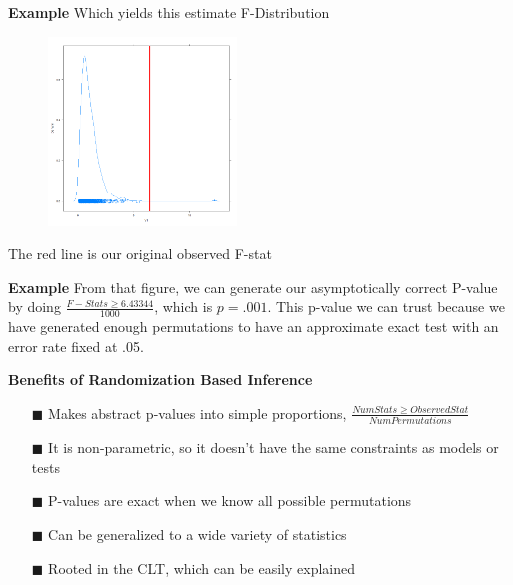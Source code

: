\documentclass{beamer}
\begin{document}
\begin{frame}{\textbf{Example}}
Which yields this estimate F-Distribution
     \begin{figure}
        \centering
        \includegraphics[width = 5cm]{DensityPlot.png}
    \end{figure}
The red line is our original observed F-stat
\end{frame}
\begin{frame}{\textbf{Example}}
    From that figure, we can generate our asymptotically correct P-value by doing $\frac{F-Stats \geq{6.43344}}{1000}$, which is $p = .001$. 
    This p-value we can trust because we have generated enough permutations to have an approximate exact test with an error rate fixed at .05. 
\end{frame}
\begin{frame}{\textbf{Benefits of Randomization Based Inference}}
    \begin{itemize}
    
        \item[$\blacksquare$] Makes abstract p-values into simple proportions, $\frac{Num Stats \geq{Observed Stat}}{NumPermutations}$ 
        
        \item[$\blacksquare$] It is non-parametric, so it doesn't have the same constraints as models or tests
        
        \item[$\blacksquare$] P-values are exact when we know all possible permutations
        
        \item[$\blacksquare$] Can be generalized to a wide variety of statistics
        
        \item[$\blacksquare$] Rooted in the CLT, which can be easily explained
        
    \end{itemize}
\end{frame}
\end{document}
